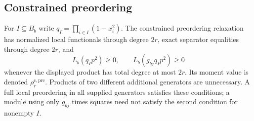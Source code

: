 \subsection{Constrained preordering}\label{sec:ext-pre}

For $I\subseteq B_b$ write $q_I=\prod_{i\in I}(1-x_i^2)$. The constrained
preordering relaxation has normalized local functionals through degree
$2r$, exact separator equalities through degree $2r$, and
\begin{equation}\label{eq:ext-pre-localizers}
 L_b(q_Ip^2)\ge0,\qquad L_b(g_{bj}q_Ip^2)\ge0
\end{equation}
whenever the displayed product has total degree at most $2r$. Its moment
value is denoted $\rho_r^{\mathrm{c,pre}}$. Products of two different
additional generators are unnecessary. A full local preordering in all
supplied generators satisfies these conditions; a module using only
$g_{bj}$ times squares need not satisfy the second condition for nonempty
$I$.

